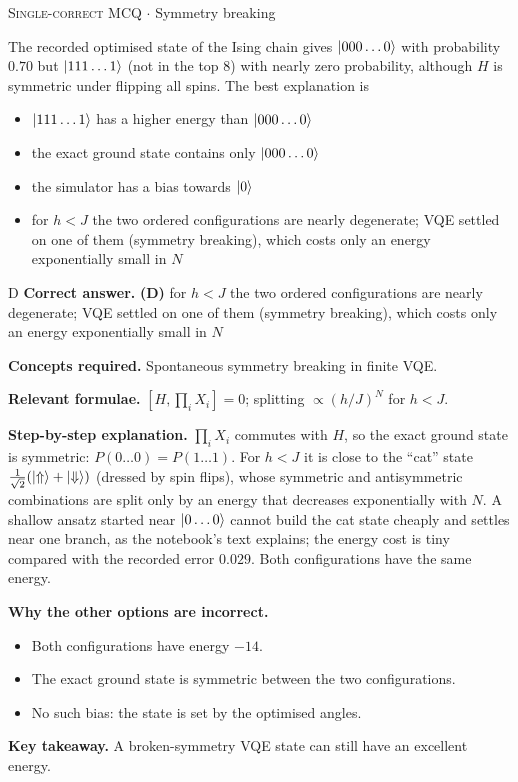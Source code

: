 \documentclass[11pt,a4paper]{article}
\newcommand{\optlabel}[1]{\textbf{(#1)}}
\newcommand{\correctlabel}[1]{\textcolor{okgreen}{\textbf{(#1)}\,\ding{51}}}
\newenvironment{qitem}[1]{\begin{list}{}{\setlength{\leftmargin}{3.3em}\setlength{\labelwidth}{3.1em}%
  \setlength{\labelsep}{0.2em}\setlength{\topsep}{3pt}\setlength{\parsep}{3pt}}\item[\textbf{Q.#1}\hfill]}{\end{list}}
\newcommand{\qsep}{\par\vspace{2pt}{\color{black!15}\hrule}\vspace{4pt}}
\newcommand{\qmeta}[2]{{\footnotesize\color{black!60}\textsc{#1} \;$\cdot$\; #2}\par}
\begin{document}
\begin{qitem}{57}
\qmeta{Single-correct MCQ}{Symmetry breaking}
The recorded optimised state of the Ising chain gives $\ket{000\dots0}$ with probability $0.70$ but $\ket{111\dots1}$ (not in the top 8) with nearly zero
probability, although $H$ is symmetric under flipping all spins. The best explanation is
\begin{itemize}[leftmargin=2.6em, labelsep=0.4em, itemsep=2pt, topsep=3pt]
\item[\optlabel{A}] $\ket{111\dots1}$ has a higher energy than $\ket{000\dots0}$
\item[\optlabel{B}] the exact ground state contains only $\ket{000\dots0}$
\item[\optlabel{C}] the simulator has a bias towards $\ket0$
\item[\correctlabel{D}] for $h < J$ the two ordered configurations are nearly degenerate; VQE settled on one of them (symmetry breaking), which costs only an energy exponentially small in $N$
\end{itemize}
\end{qitem}
\begin{solbox}{D}
\textbf{\color{brand}Correct answer.} \textcolor{okgreen}{\textbf{(D)}} for $h < J$ the two ordered configurations are nearly degenerate; VQE settled on one of them (symmetry breaking), which costs only an energy exponentially small in $N$

\textbf{\color{brand}Concepts required.} Spontaneous symmetry breaking in finite VQE.

\textbf{\color{brand}Relevant formulae.} $[H, \prod_iX_i] = 0$; splitting $\propto (h/J)^N$ for $h < J$.

\textbf{\color{brand}Step-by-step explanation.} $\prod_iX_i$ commutes with $H$, so the exact ground state is symmetric: $P(0\dots0) = P(1\dots1)$. For $h < J$ it is close to the ``cat'' state
$\frac{1}{\sqrt2}(\ket{\Uparrow} + \ket{\Downarrow})$ (dressed by spin flips), whose symmetric and antisymmetric combinations are split only by an energy that
decreases exponentially with $N$. A shallow ansatz started near $\ket{0\dots0}$ cannot build the cat state cheaply and settles near one branch, as the
notebook's text explains; the energy cost is tiny compared with the recorded error $0.029$. Both configurations have the same energy.

\textbf{\color{brand}Why the other options are incorrect.}
\begin{itemize}[leftmargin=2.4em, itemsep=1pt, topsep=2pt]
\item[\textbf{(A)}] Both configurations have energy $-14$.
\item[\textbf{(B)}] The exact ground state is symmetric between the two configurations.
\item[\textbf{(C)}] No such bias: the state is set by the optimised angles.
\end{itemize}
\textbf{\color{brand}Key takeaway.} A broken-symmetry VQE state can still have an excellent energy.
\end{solbox}
\qsep
\end{document}

